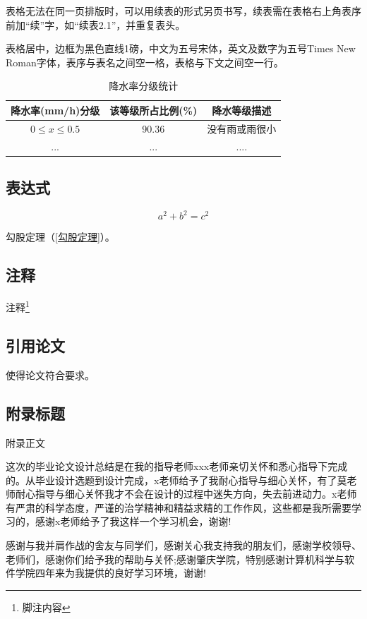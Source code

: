 \documentclass[bachelor,nocolorlinks, printoneside]{seuthesis} %
\begin{document}
\begin{Main}
表格无法在同一页排版时，可以用续表的形式另页书写，续表需在表格右上角表序前加“续”字，如“续表2.1”，并重复表头。

表格居中，边框为黑色直线1磅，中文为五号宋体，英文及数字为五号Times New Roman字体，表序与表名之间空一格，表格与下文之间空一行。

\begin{table}[htbp]
    \caption{降水率分级统计} 
    \centering
	\wuhao
    \begin{tabular}{ccc} 
		\hline
        降水率(mm/h)分级 & 该等级所占比例(\%) & 降水等级描述  \\
		\hline
        $0\le x\le 0.5$& 90.36 & 没有雨或雨很小 \\
        ... & ...&....  \\
		\hline
\end{tabular}\end{table}

\section{表达式}
\begin{equation}
a^2+b^2=c^2\label{勾股定理}
\end{equation}

勾股定理（\ref{勾股定理}）。

\section{注释}

注释\footnote{脚注内容}

\section{引用论文}
使得论文符合要求\cite{Yao:2015ix}\cite{seucover}\cite{test1}\cite{test}\cite{R1}。



\begin{Appendix}
\chapter{附录标题}
附录正文
\end{Appendix}

\begin{Acknowledgement}{}
这次的毕业论文设计总结是在我的指导老师xxx老师亲切关怀和悉心指导下完成的。从毕业设计选题到设计完成，x老师给予了我耐心指导与细心关怀，有了莫老师耐心指导与细心关怀我才不会在设计的过程中迷失方向，失去前进动力。x老师有严肃的科学态度，严谨的治学精神和精益求精的工作作风，这些都是我所需要学习的，感谢x老师给予了我这样一个学习机会，谢谢!

感谢与我并肩作战的舍友与同学们，感谢关心我支持我的朋友们，感谢学校领导、老师们，感谢你们给予我的帮助与关怀;感谢肇庆学院，特别感谢计算机科学与软件学院四年来为我提供的良好学习环境，谢谢!
\end{Acknowledgement}

\newpage
\printindex %

\end{Main} %



%
%
\end{document}

